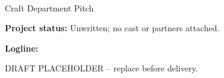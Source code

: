 \documentclass[11pt,letterpaper]{article}
\begin{document}
\begin{center}
{\Large\bfseries\sffamily \filmtitleupper}\\[6pt]
Craft Department Pitch
\end{center}
\textbf{Project status:} Unwritten; no cast or partners attached.

\textbf{Logline:} \filmlogline

DRAFT PLACEHOLDER -- replace before delivery.
\end{document}
